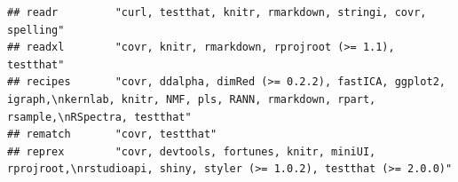 \documentclass[]{article}
\begin{document}
\begin{verbatim}
## readr         "curl, testthat, knitr, rmarkdown, stringi, covr, spelling"                                                                                                                                                                                                                                                                                                                                                                                                                                                                                                                               
## readxl        "covr, knitr, rmarkdown, rprojroot (>= 1.1), testthat"                                                                                                                                                                                                                                                                                                                                                                                                                                                                                                                                    
## recipes       "covr, ddalpha, dimRed (>= 0.2.2), fastICA, ggplot2, igraph,\nkernlab, knitr, NMF, pls, RANN, rmarkdown, rpart, rsample,\nRSpectra, testthat"                                                                                                                                                                                                                                                                                                                                                                                                                                             
## rematch       "covr, testthat"                                                                                                                                                                                                                                                                                                                                                                                                                                                                                                                                                                          
## reprex        "covr, devtools, fortunes, knitr, miniUI, rprojroot,\nrstudioapi, shiny, styler (>= 1.0.2), testthat (>= 2.0.0)"                                                                                                                                                                                                                                                                                                                                                                                                                                                                          

\end{verbatim}
\end{document}
